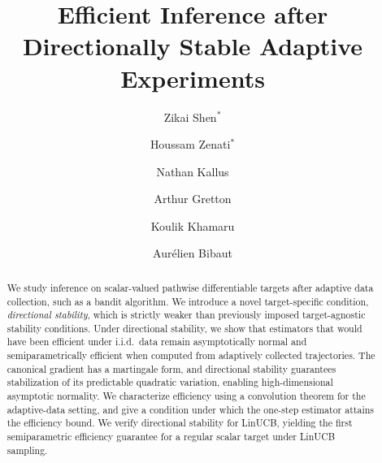 \documentclass[11pt]{article}
\title{Efficient Inference after Directionally Stable Adaptive Experiments}
\author[1]{Zikai Shen$^{*}$}
\author[2]{Houssam Zenati$^{*}$}
\author[3,4]{Nathan Kallus}
\author[2,5]{Arthur Gretton}
\author[6]{Koulik Khamaru}
\author[4]{Aurélien Bibaut}
\affil[1]{University College London}
\affil[2]{Gatsby Computational Neuroscience Unit,
University College London}
\affil[3]{Cornell University}
\affil[4]{Netflix}
\affil[5]{Google DeepMind}
\affil[6]{Rutgers University}
\begin{document}
\maketitle
\setcounter{footnote}{0}
\renewcommand{\thefootnote}{\fnsymbol{footnote}} %

\begin{abstract}
We study inference on scalar-valued pathwise differentiable targets after adaptive data collection, such as a bandit algorithm.
%
We introduce a novel target-specific condition, \textit{directional stability},
which is strictly weaker than previously imposed target-agnostic stability conditions. 
Under directional stability, we show that estimators that would have been efficient under i.i.d.\ data remain asymptotically normal and semiparametrically efficient when computed from adaptively collected trajectories. The canonical gradient has a martingale form, and directional stability guarantees stabilization of its predictable quadratic variation, enabling high-dimensional asymptotic normality. We characterize efficiency using a convolution theorem for the adaptive-data setting, and give a condition under which the one-step estimator attains the efficiency bound.
We verify directional stability for LinUCB, yielding the first semiparametric efficiency guarantee for a regular scalar target under LinUCB sampling.

\end{abstract}
\end{document}
